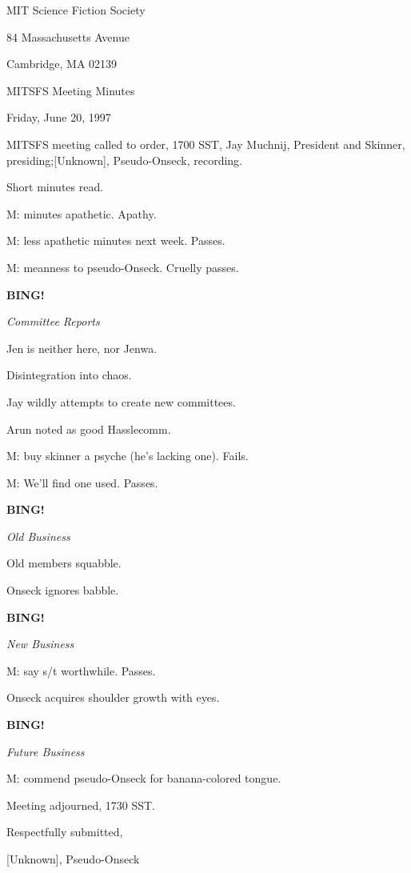 \documentclass[12pt]{article}
\newcommand{\bing}{{\bf BING!} }
\newcommand{\goto}[1]{\bing \vskip 12pt \centerline{{\em{#1}}}}
\begin{document}
\begin{center}

MIT Science Fiction Society 

84 Massachusetts Avenue

Cambridge, MA 02139

\vspace{12pt}

MITSFS Meeting Minutes 

Friday, June 20, 1997

\end{center}
 
\vspace{18pt}

\setlength{\parskip}{6pt}

\noindent
MITSFS meeting called to order, 1700 SST,
Jay Muchnij, President and Skinner, presiding;[Unknown], Pseudo-Onseck, recording.

Short minutes read.

M: minutes apathetic. Apathy.

M: less apathetic minutes next week. Passes.

M: meanness to pseudo-Onseck. Cruelly passes.

\goto{Committee Reports}

Jen is neither here, nor Jenwa.

Disintegration into chaos.

Jay wildly attempts to create new committees.

Arun noted as good Hasslecomm.

M: buy skinner a psyche (he's lacking one). Fails.

M: We'll find one used. Passes.

\goto{Old Business}

Old members squabble.

Onseck ignores babble.

\goto{New Business}

M: say s/t worthwhile. Passes.

Onseck acquires shoulder growth with eyes.

\goto{Future Business}

M: commend pseudo-Onseck for banana-colored tongue.

\vspace{12pt}

\noindent
Meeting adjourned, 1730 SST.

\vspace{18pt}

\centerline{Respectfully submitted,}
\centerline{[Unknown], Pseudo-Onseck}
\end{document}
